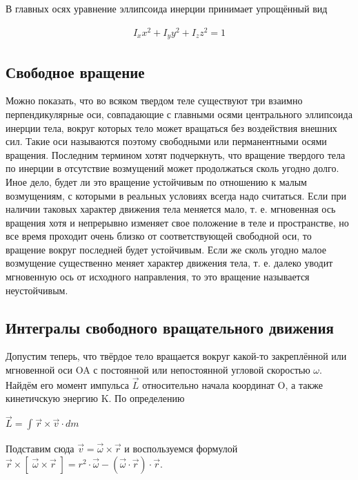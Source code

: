 \documentclass{article}
\begin{document}
В главных осях уравнение эллипсоида инерции принимает упрощённый вид

\begin{equation} 
\begin{gathered}
\label{(4)}
I_xx^2+I_yy^2+I_zz^2 = 1
\end{gathered}
\end{equation}

\subsection{Свободное вращение}

Можно показать, что  во всяком твердом теле существуют три взаимно перпендикулярные оси, совпадающие с главными осями центрального эллипсоида инерции тела, вокруг которых тело может вращаться без воздействия внешних сил. Такие оси называются поэтому свободными или перманентными осями вращения. Последним термином хотят подчеркнуть, что вращение твердого тела по инерции в отсутствие возмущений может продолжаться сколь угодно долго. Иное дело, будет ли это вращение устойчивым по отношению к малым возмущениям, с которыми в реальных условиях всегда надо считаться. Если при наличии таковых характер движения тела меняется мало, т. е. мгновенная ось вращения хотя и непрерывно изменяет свое положение в теле и пространстве, но все время проходит очень близко от соответствующей свободной оси, то вращение вокруг последней будет устойчивым. Если же сколь угодно малое возмущение существенно меняет характер движения тела, т. е. далеко уводит мгновенную ось от исходного направления, то это вращение называется неустойчивым. 

\subsection{Интегралы свободного вращательного движения}
Допустим теперь, что твёрдое тело вращается вокруг какой-то закреплённой или мгновенной оси OA с постоянной или непостоянной угловой скоростью $\omega$. Найдём его момент импульса $\vec{L}$ относительно начала координат O, а также кинетичскую энергию K. По определению 

\begin{center}
    $\vec{L} = \int_{}^{}\vec{r}\times\vec{v} \cdot dm$      
\end{center}

Подставим сюда 
$\vec{v}={\vec{\omega}}\times{\vec{r}}$ и воспользуемся формулой $\vec{r}\times[\;\vec{\omega}\times\vec{r}\;]= r^2\cdot\vec{\omega} - (\vec{\omega}\cdot\vec{r})\cdot\vec{r}$.
\end{document}
